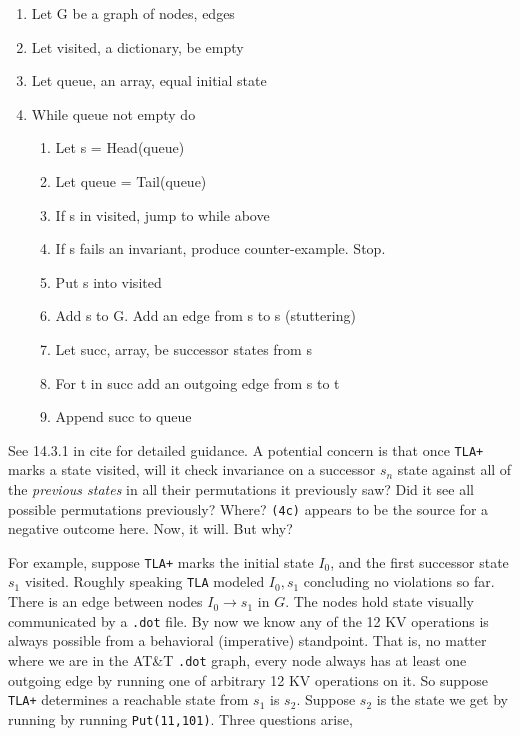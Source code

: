 \documentclass[twocolumn]{article}
\begin{document}
\begin{enumerate}
\item Let G be a graph of nodes, edges
\item Let visited, a dictionary, be empty
\item Let queue, an array, equal initial state
\item While queue not empty do
	\begin{enumerate}
	\item Let s = Head(queue)
	\item Let queue = Tail(queue)
	\item If s in visited, jump to while above
	\item If s fails an invariant, produce counter-example. Stop.
	\item Put s into visited
	\item Add s to G. Add an edge from s to s (stuttering)
	\item Let succ, array, be successor states from s
	\item For t in succ add an outgoing edge from s to t
	\item Append succ to queue
	\end{enumerate}
\end{enumerate}

\noindent See 14.3.1 in cite for detailed guidance. A potential concern is that once \texttt{TLA+} marks a state visited, will it check invariance on a successor $s_n$ state against all of the \emph{previous states} in all their permutations it previously saw? Did it see all possible permutations previously? Where? \texttt{(4c)} appears to be the source for a negative outcome here. Now, it will. But why?

For example, suppose \texttt{TLA+} marks the initial state $I_0$, and the first successor state $s_1$ visited. Roughly speaking \texttt{TLA} modeled $I_0, s_1$ concluding no violations so far. There is an edge between nodes $I_0 \rightarrow s_1$ in $G$. The nodes hold state visually communicated by a \texttt{.dot} file. By now we know any of the 12 KV operations is always possible from a behavioral (imperative) standpoint. That is, no matter where we are in the AT\&T \texttt{.dot} graph, every node always has at least one outgoing edge by running one of arbitrary 12 KV operations on it. So suppose \texttt{TLA+} determines a reachable state from $s_1$ is $s_2$. Suppose $s_2$ is the state we get by running by running \texttt{Put(11,101)}. Three questions arise,
\end{document}
